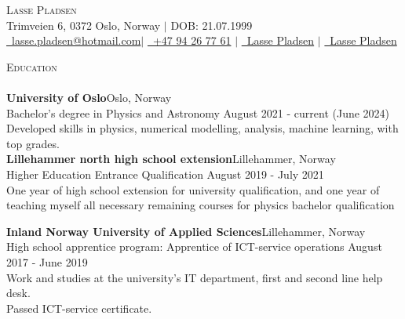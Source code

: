 \documentclass[a4paper]{article}
\newcommand{\lineunder} {
    \vspace*{-8pt} \\
    \hspace*{-18pt} \hrulefill \\
}
\newcommand{\header} [1] {
    {\hspace*{-18pt}\vspace*{6pt} \textsc{#1}}
    \vspace*{-6pt} \lineunder
}
\begin{document}
\vspace*{-40pt}

    

\vspace*{-10pt}
\begin{center}
	{\Huge \scshape {Lasse Pladsen}}\\
	Trimveien 6, 0372 Oslo, Norway $|$ DOB: 21.07.1999 \\ \href{mailto:lasse.pladsen@hotmail.com}{\raisebox{-0.05\height}\faEnvelope \ lasse.pladsen@hotmail.com}$|$ \href{tel:+4794267761}{\raisebox{-0.05\height}\faMobile \ +47 94 26 77 61} $|$ \href{https://www.linkedin.com/in/lasse-p-313b41126/}{\raisebox{-0.05\height}\faLinkedin\ Lasse Pladsen} $|$ \href{https://github.com/LassePladsen}{\raisebox{-0.05\height}\faGithub\ Lasse Pladsen} \\
\end{center}

\header{Education}
\textbf{University of Oslo}\hfill Oslo, Norway\\
Bachelor's degree in Physics and Astronomy \hfill August 2021 - current (June 2024)\\
Developed skills in physics, numerical modelling, analysis, machine learning, with top grades.\\
\vspace{2mm}
\textbf{Lillehammer north high school extension}\hfill Lillehammer, Norway\\
Higher Education Entrance Qualification \hfill August 2019 - July 2021\\
One year of high school extension for university qualification,
and one year of teaching myself all necessary remaining courses
for physics bachelor qualification 

\vspace{2mm}
\textbf{Inland Norway
University of Applied Sciences}\hfill Lillehammer, Norway\\
High school apprentice program: Apprentice of ICT-service operations \hfill August 2017 - June 2019\\
Work and studies at the university's IT department, first and second line help desk.\\
Passed ICT-service certificate.

\vspace{2mm}
\end{document}
